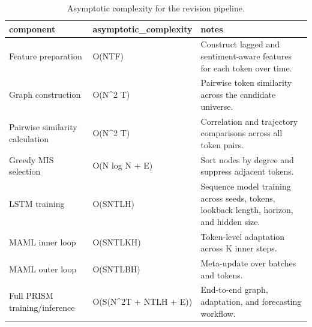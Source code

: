 \begin{table}[htbp]
\centering
\begin{tabular}{lll}
\hline
component & asymptotic_complexity & notes \\
\hline
Feature preparation & O(NTF) & Construct lagged and sentiment-aware features for each token over time. \\
Graph construction & O(N^2 T) & Pairwise token similarity across the candidate universe. \\
Pairwise similarity calculation & O(N^2 T) & Correlation and trajectory comparisons across all token pairs. \\
Greedy MIS selection & O(N log N + E) & Sort nodes by degree and suppress adjacent tokens. \\
LSTM training & O(SNTLH) & Sequence model training across seeds, tokens, lookback length, horizon, and hidden size. \\
MAML inner loop & O(SNTLKH) & Token-level adaptation across K inner steps. \\
MAML outer loop & O(SNTLBH) & Meta-update over batches and tokens. \\
Full PRISM training/inference & O(S(N^2T + NTLH + E)) & End-to-end graph, adaptation, and forecasting workflow. \\
\hline
\end{tabular}
\caption{Asymptotic complexity for the revision pipeline.}
\label{table_complexity_analysis}
\end{table}